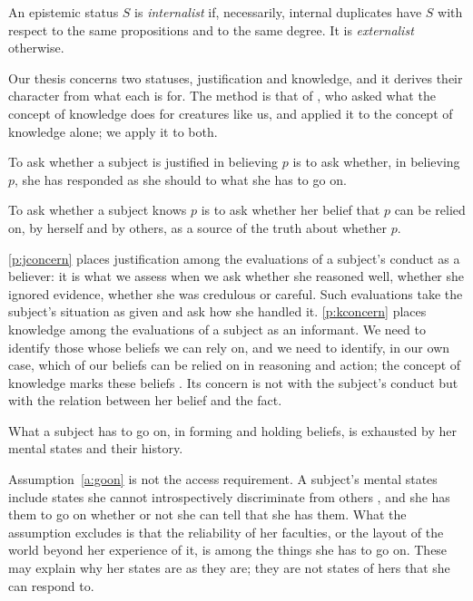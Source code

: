 \documentclass{situationist-preprint}
\begin{document}
\begin{definition}\label{d:int}
An epistemic status $S$ is \emph{internalist} if, necessarily, internal duplicates have $S$ with respect to the same propositions and to the same degree. It is \emph{externalist} otherwise.
\end{definition}

Our thesis concerns two statuses, justification and knowledge, and it derives their character from what each is for. The method is that of \citet{Craig1990}, who asked what the concept of knowledge does for creatures like us, and applied it to the concept of knowledge alone; we apply it to both.

\begin{principle}\label{p:jconcern}
To ask whether a subject is justified in believing $p$ is to ask whether, in believing $p$, she has responded as she should to what she has to go on.
\end{principle}

\begin{principle}\label{p:kconcern}
To ask whether a subject knows $p$ is to ask whether her belief that $p$ can be relied on, by herself and by others, as a source of the truth about whether $p$.
\end{principle}

\ref{p:jconcern} places justification among the evaluations of a subject's conduct as a believer: it is what we assess when we ask whether she reasoned well, whether she ignored evidence, whether she was credulous or careful. Such evaluations take the subject's situation as given and ask how she handled it. \ref{p:kconcern} places knowledge among the evaluations of a subject as an informant. We need to identify those whose beliefs we can rely on, and we need to identify, in our own case, which of our beliefs can be relied on in reasoning and action; the concept of knowledge marks these beliefs \citep{Craig1990}. Its concern is not with the subject's conduct but with the relation between her belief and the fact.

\begin{assumption}\label{a:goon}
What a subject has to go on, in forming and holding beliefs, is exhausted by her mental states and their history.
\end{assumption}

Assumption~\ref{a:goon} is not the access requirement. A subject's mental states include states she cannot introspectively discriminate from others \citep[ch.~4]{Williamson2000}, and she has them to go on whether or not she can tell that she has them. What the assumption excludes is that the reliability of her faculties, or the layout of the world beyond her experience of it, is among the things she has to go on. These may explain why her states are as they are; they are not states of hers that she can respond to.
\end{document}
